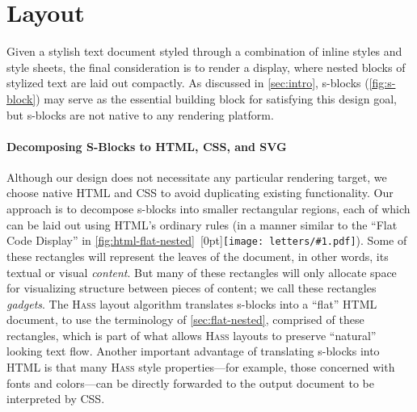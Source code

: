 \documentclass[acmsmall, screen]{acmart}
\newcommand{\parahead}[1]
  {\paragraph{\textbf{#1}}}
\newcommand{\hass}
{\textsc{Hass}}
\newcommand{\figBubble}[1]{\raisebox{-0.03in}[0pt]{\texttt{[image: letters/\#1.pdf]}}}
\newcommand{\refBubble}[1]
  {~\figBubble{#1}}
\begin{document}
 
\section{Layout}
\label{sec:layout}













Given a stylish text document styled through a combination of inline styles and style sheets,
the final consideration is to render a display, where nested blocks of stylized text are laid out compactly.
As discussed in \autoref{sec:intro}, s-blocks (\autoref{fig:s-block}) may serve as the essential building block for satisfying this design goal, but s-blocks are not native to any rendering platform.

\parahead{Decomposing S-Blocks to HTML, CSS, and SVG}
Although our design does not necessitate any particular rendering target, we choose native HTML and CSS to avoid duplicating existing functionality.
Our approach is to decompose s-blocks into smaller rectangular regions, each of which can be laid out using HTML's ordinary rules (in a manner similar to the ``Flat Code Display'' in \autoref{fig:html-flat-nested}\refBubble{a}).
Some of these rectangles will represent the leaves of the document, in other words, its textual or visual \textit{content}.
But many of these rectangles will only allocate space for visualizing structure between pieces of content; we call these rectangles \textit{gadgets}.
The \hass{} layout algorithm translates s-blocks into a ``flat'' HTML document, to use the terminology of \autoref{sec:flat-nested}, comprised of these rectangles, which is part of what allows \hass{} layouts to preserve ``natural'' looking text flow.
Another important advantage of translating s-blocks into HTML is that many \hass{} style properties---for example, those concerned with fonts and colors---can be directly forwarded to the output document to be interpreted by CSS.
\end{document}
